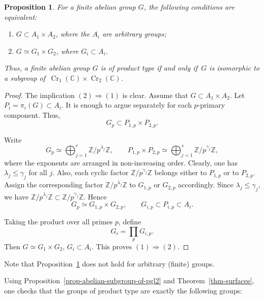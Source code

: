 \documentclass[11pt]{amsart}
\numberwithin{equation}{section}
\newtheorem{proposition}[thm]{Proposition}
\theoremstyle{definition}
\theoremstyle{remark}
\DeclareMathOperator{\Cr}{Cr}
\begin{document}
\begin{proposition}
\label{prop-two-conditions-for-abelian-groups}
For a finite abelian group $G$, the following conditions are equivalent: 
\begin{enumerate}
\item\label{ptcfag-1}
$G\subset A_1\times A_2$, where the $A_i$ are arbitrary groups;
\item\label{ptcfag-2}
$G\simeq G_1\times G_2$, where $G_i\subset A_i$.
\end{enumerate}
Thus, a finite abelian group $G$ is of product type if and only if\, $G$ is isomorphic to a subgroup of\, $\Cr_1(\mathbb{C})\times\Cr_2(\mathbb{C})$.
\end{proposition}
\begin{proof}

The implication $(2)\Rightarrow(1)$ is clear. Assume that $G\subset A_1\times A_2$. 
Let $P_i=\pi_i(G)\subset A_i$. 
It is enough to argue separately for each $p$-primary component. Thus,
\[
G_p\subset P_{1,p}\times P_{2,p}.
\]

Write
\[
G_p\simeq \bigoplus_{j=1}^{r}\mathbb Z/p^{\lambda_j}\mathbb Z,
\qquad
P_{1,p}\times P_{2,p}
\simeq
\bigoplus_{j=1}^{s}\mathbb Z/p^{\gamma_j}\mathbb Z,
\]
where the exponents are arranged in non-increasing order. Clearly, one has $\lambda_j\leq \gamma_j$ for all $j$. 
Also, each cyclic factor $\mathbb Z/p^{\gamma_j}\mathbb Z$ belongs either to
$P_{1,p}$ or to $P_{2,p}$. Assign the corresponding factor
$\mathbb Z/p^{\lambda_j}\mathbb Z$ to $G_{1,p}$ or $G_{2,p}$ accordingly.
Since $\lambda_j\leq\gamma_j$, we have
$
\mathbb Z/p^{\lambda_j}\mathbb Z
\subset
\mathbb Z/p^{\gamma_j}\mathbb Z.
$
Hence
\[
G_p\simeq G_{1,p}\times G_{2,p},
\qquad
G_{i,p}\subset P_{i,p}\subset A_i.
\]

Taking the product over all primes $p$, define
\[
G_i=\prod_p G_{i,p}.
\]
Then
$G\simeq G_1\times G_2$, $G_i\subset A_i$.
This proves $(1)\Rightarrow(2)$.
\color{black}
\end{proof} 

Note that Proposition~\ref{prop-two-conditions-for-abelian-groups} does not hold for arbitrary (finite) groups. 

Using Proposition~\ref{prop-abelian-subgroup-of-pgl2} and Theorem~\ref{thm-surfaces}, one checks that the groups of product type are exactly the 
following groups:
\end{document}
